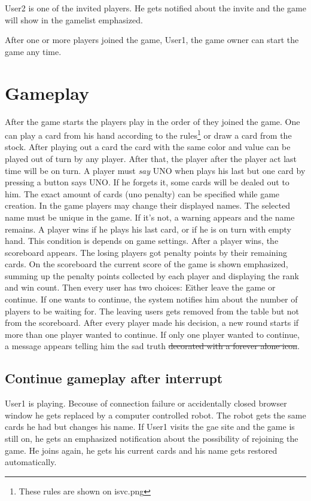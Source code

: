 \documentclass[a4paper,10pt]{article}
\begin{document}
User2 is one of the invited players. He gets notified about the invite and the game will show in the gamelist emphasized.

After one or more players joined the game, User1, the game owner can start the game any time.
	
	\section{Gameplay}
After the game starts the players play in the order of they joined the game. One can play a card from his hand according to the rules\footnote{These rules are shown on isvc.png} or draw a card from the stock. After playing out a card the card with the same color and value can be played out of turn by any player. After that, the player after the player act last time will be on turn. A player must \emph{say} UNO when  plays his last but one card by pressing a button says UNO. If he forgets it, some cards will be dealed out to him. The exact amount of cards (uno penalty) can be specified while game creation.
In the game players may change their displayed names. The selected name must be unique in the game. If it's not, a warning appears and the name remains.
A player wins if he plays his last card, or if he is on turn with empty hand. This condition is depends on game settings. After a player wins, the scoreboard appears. The losing players got penalty points by their remaining cards. On the scoreboard the current score of the game is shown emphasized, summing up the penalty points collected by each player and displaying the rank and win count. Then every user has two choices: Either leave the game or continue. If one wants to continue, the system notifies him about the number of players to be waiting for. The leaving users gets removed from the table but not from the scoreboard. After every player made his decision, a new round starts if more than one player wanted to continue. If only one player wanted to continue, a message appears telling him the sad truth \sout{decorated with a forever alone icon}.
	\subsection{Continue gameplay after interrupt}
User1 is playing. Becouse of connection failure	or accidentally closed browser window he gets replaced by a computer controlled robot. The robot gets the same cards he had but changes his name. If User1 visits the gae site and the game is still on, he gets an emphasized notification about the possibility of rejoining the game. He joins again, he gets his current cards and his name gets restored automatically.
\end{document}
